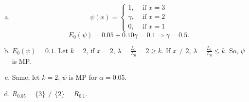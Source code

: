 \begin{solution}
    \begin{enumerate}[(a)]
        \item \[
            \psi(x)=\left\{\begin{matrix}
            1, & \text { if } x=3 \\
            \gamma, & \text { if } x=2 \\
            0, & \text { if } x=1
            \end{matrix}\right.
        \]
        \[
            E_0(\psi)=0.05+0.10\gamma=0.1 \Rightarrow \gamma=0.5. 
        \]
        \item $E_0(\psi)=0.1$. Let $k=2$, if $x=2$, $\lambda=\frac{L_1}{L_0}=2\geqslant k$. If $x\neq2$, $\lambda=\frac{L_1}{L_0}\leqslant k$. So, $\psi$ is MP. 
        \item Same, let $k=2$, $\psi$ is MP for $\alpha=0.05$. 
        \item $R_{0.05}=\{3\}\neq\{2\}=R_{0.1}$. 
    \end{enumerate}
\end{solution}








